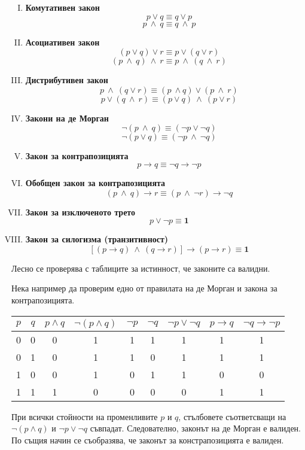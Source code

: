 \begin{enumerate}[I)]
  \item
    {\bf Комутативен закон}
    \[p\vee q \equiv q\vee p\] 
    \[p\ \wedge\ q \equiv q\ \wedge\ p\]
  \item
    {\bf Асоциативен закон}
    \[(p\vee q)\vee r \equiv p\vee(q\vee r)\]
    \[(p\ \wedge\ q)\ \wedge\ r \equiv p\ \wedge\ (q\ \wedge\ r)\]
  \item
    {\bf Дистрибутивен закон}
    \[p\ \wedge\ (q \vee r) \equiv (p\ \wedge q)\vee (p\ \wedge\ r)\]
    \[p\vee (q\ \wedge\ r) \equiv (p\vee q)\ \wedge\ (p\vee r)\]
  \item
    {\bf Закони на де Морган}
    \[\neg(p\ \wedge\ q) \equiv (\neg p \vee \neg q)\]
    \[\neg(p\vee q) \equiv (\neg p\ \wedge\ \neg q)\]
  \item
    {\bf Закон за контрапозицията}
    \[p\rightarrow q \equiv \neg q \rightarrow \neg p\]
  \item
    {\bf Обобщен закон за контрапозицията}
    \[(p\ \wedge\ q)\rightarrow r \equiv (p\ \wedge\ \neg r) \rightarrow \neg q\]
  \item
    {\bf Закон за изключеното трето}
    \[p\vee \neg p \equiv {\mathbf 1}\]
  \item
    {\bf Закон за силогизма (транзитивност)}
    \[[(p\rightarrow q)\ \wedge\ (q\rightarrow r)] \rightarrow (p\rightarrow r) \equiv {\mathbf 1}\]
\end{enumerate}

Лесно се проверява с таблиците за истинност, че законите са валидни.

\begin{example}
  Нека например да проверим едно от правилата на де Морган и закона
  за контрапозицията.
  
  \begin{tabular}{|c|c|c|c|c|c|c|c|c|}
    \hline
    $p$ & $q$ & $p\wedge q$ & $\neg(p\wedge q)$ & $\neg p$ & $\neg q$ & $\neg p \vee \neg q$ & $p \rightarrow q$ & $\neg q \rightarrow \neg p$\\
    \hline
    0 & 0 & 0 & 1 & 1 & 1 & 1 & 1 & 1 \\
    \hline
    0 & 1 & 0 & 1 & 1 & 0 & 1 & 1 & 1 \\
    \hline
    1 & 0 & 0 & 1 & 0 & 1 & 1 & 0 & 0 \\
    \hline
    1 & 1 & 1 & 0 & 0 & 0 & 0 & 1 & 1 \\
    \hline
  \end{tabular}
  
  При всички стойности на променливите $p$ и $q$, стълбовете съответсващи на $\neg(p \wedge q)$ и $\neg p \vee \neg q$
  съвпадат. Следователно, законът на де Морган е валиден.
  По същия начин се съобразява, че законът за констрапозицията е валиден.
\end{example}


